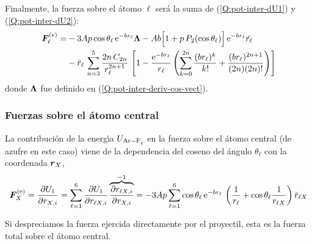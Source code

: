 \begin{subappendices}
Finalmente, la fuerza sobre el \'{a}tomo $\ell$ ser\'{a} la suma de (\ref{Q:pot-inter-dU1}) y (\ref{Q:pot-inter-dU2}):
\begin{align} \label{Q:pot-inter-fuerzas}
    \bm{F}^{\text{(e)}}_{\ell} =& - 3 A p \cos \theta_{\ell}\, \mathrm{e}^{-b r_{\ell}} \bm{\Lambda} - A b \Big[1 + p\, P_{2}(\cos \theta_{\ell})\Big]\,\mathrm{e}^{-b r_{\ell}} \breve{r_{\ell}} \nonumber \\
                     &- \breve{r}_{\ell}\, \sum_{n=3}^{5} \frac{2 n\, C_{2n}}{r_{\ell}^{2n+1}} \,\left[ 1 - \frac{\mathrm{e}^{-br_{\ell}}}{r_{\ell}} \left( \sum_{k=0}^{2n}\frac{(br_{\ell})^{k}}{k!} + \frac{(br_{\ell})^{2n+1}}{(2n)(2n)!} \right) \right] 
\end{align}
%
donde $\bm{\Lambda}$ fue definido en (\ref{Q:pot-inter-deriv-cos-vect}).

\subsubsection{Fuerzas sobre el \'{a}tomo central}

La contribuci\'{o}n de la energ\'{\i}a $U_{\ce{Ar-F_{\ell}}}$ en la fuerza sobre el \'{a}tomo central (de azufre en este caso) viene de la dependencia del coseno del \'{a}ngulo $\theta_{\ell}$ con la coordenada $\bm{r}_{X}$,
\begin{equation}
  \label{Q:pot-inter-fuerza-S}
  \bm{F}^{\text{(e)}}_{X} = \frac{\partial U_{1}}{\partial r_{X,i}} = \sum_{\ell=1}^{6} \frac{\partial U_{1}}{\partial r_{\ell X,i}} \overbrace{ \frac{\partial r_{\ell X,i}}{\partial r_{X,i}}}^{-1} = - 3 A p \sum_{\ell=1}^{6} \cos \theta_{\ell}\, \mathrm{e}^{-b r_{\ell}} \,  \left( \frac{1}{r_{\ell}} + \cos \theta_{\ell}\frac{1}{r_{\ell X}} \right) \breve{r}_{\ell X} 
\end{equation}

Si despreciamos la fuerza ejercida directamente por el proyectil, esta es la fuerza total sobre el \'{a}tomo central.

\end{subappendices}

